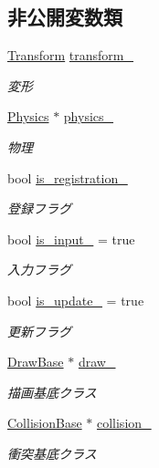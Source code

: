 \subsection*{非公開変数類}
\begin{DoxyCompactItemize}
\item 
\mbox{\hyperlink{class_transform}{Transform}} \mbox{\hyperlink{class_game_object_base_a9e84cc5213c2ee289e2ca2c8b0fc73ba}{transform\+\_\+}}
\begin{DoxyCompactList}\small\item\em 変形 \end{DoxyCompactList}\item 
\mbox{\hyperlink{class_physics}{Physics}} $\ast$ \mbox{\hyperlink{class_game_object_base_a239603d2b9d165f9e666e35795a5a30c}{physics\+\_\+}}
\begin{DoxyCompactList}\small\item\em 物理 \end{DoxyCompactList}\item 
bool \mbox{\hyperlink{class_game_object_base_a1118bad7222ee50ff135e3eddbe5b1b4}{is\+\_\+registration\+\_\+}}
\begin{DoxyCompactList}\small\item\em 登録フラグ \end{DoxyCompactList}\item 
bool \mbox{\hyperlink{class_game_object_base_a1ce2ad89af7ab4648cca7ac1bb09814d}{is\+\_\+input\+\_\+}} = true
\begin{DoxyCompactList}\small\item\em 入力フラグ \end{DoxyCompactList}\item 
bool \mbox{\hyperlink{class_game_object_base_adf54fa8cad898108328e29d1e64e2593}{is\+\_\+update\+\_\+}} = true
\begin{DoxyCompactList}\small\item\em 更新フラグ \end{DoxyCompactList}\item 
\mbox{\hyperlink{class_draw_base}{Draw\+Base}} $\ast$ \mbox{\hyperlink{class_game_object_base_af98b5356a668abe576a0d20a37f26e03}{draw\+\_\+}}
\begin{DoxyCompactList}\small\item\em 描画基底クラス \end{DoxyCompactList}\item 
\mbox{\hyperlink{class_collision_base}{Collision\+Base}} $\ast$ \mbox{\hyperlink{class_game_object_base_a63c44924e1e0c90461d191fdb11f33b0}{collision\+\_\+}}
\begin{DoxyCompactList}\small\item\em 衝突基底クラス \end{DoxyCompactList}\end{DoxyCompactItemize}


